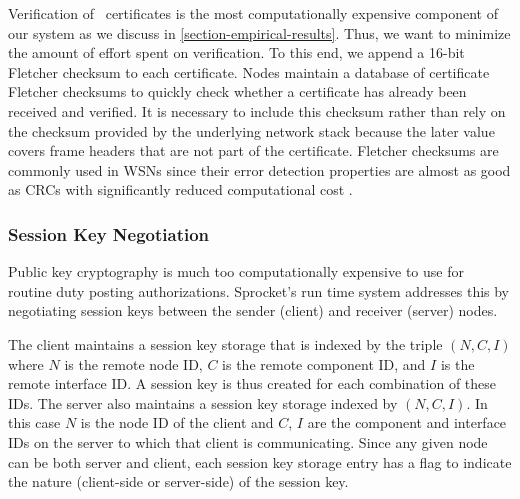 Verification of \RT\ certificates is the most computationally expensive
component of our system as we discuss in
\autoref{section-empirical-results}. Thus, we want to minimize the
amount of effort spent on verification. To this end, we append a 16-bit
Fletcher checksum to each certificate. Nodes maintain a database of
certificate Fletcher checksums to quickly check whether a certificate
has already been received and verified. It is necessary to include this
checksum rather than rely on the checksum provided by the underlying
network stack because the later value covers frame headers that are not
part of the certificate. Fletcher checksums are commonly used in WSNs
since their error detection properties are almost as good as CRCs with
significantly reduced computational cost \cite{fletcher-1982}.


\subsubsection{Session Key Negotiation}
\label{section-session-key-negotiation}

Public key cryptography is much too computationally expensive to use for
routine duty posting authorizations. Sprocket's run time system
addresses this by negotiating session keys between the sender (client)
and receiver (server) nodes.

%
%  
%

The client maintains a session key storage that is indexed by the triple
$(N, C, I)$ where $N$ is the remote node ID, $C$ is the remote component
ID, and $I$ is the remote interface ID. A session key is thus created
for each combination of these IDs. The server also maintains a session
key storage indexed by $(N, C, I)$. In this case $N$ is the node ID of
the client and $C$, $I$ are the component and interface IDs on the
server to which that client is communicating. Since any given node can
be both server and client, each session key storage entry has a flag to
indicate the nature (client-side or server-side) of the session key.

